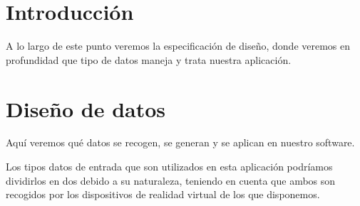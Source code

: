 
\section{Introducción}
A lo largo de este punto veremos la especificación de diseño, donde veremos en profundidad que tipo de datos maneja y trata nuestra aplicación.

\section{Diseño de datos}
Aquí veremos qué datos se recogen, se generan y se aplican en nuestro software.

Los tipos datos de entrada que son utilizados en esta aplicación podríamos dividirlos en dos debido a su naturaleza, teniendo en cuenta que ambos son recogidos por los dispositivos de realidad virtual \cite{VR} de los que disponemos.


